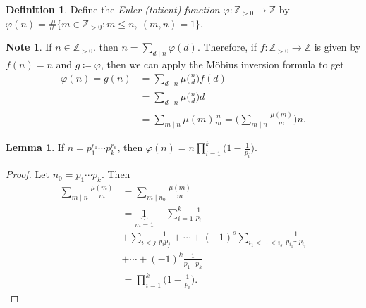 \documentclass[10pt,letterpaper,cm]{nupset}
\theoremstyle{definition}
\newtheorem*{definition}{Definition}
\newtheorem{note}{Note}
\newtheorem{lemma}{Lemma}
\newcommand{\Z}{\mathbb Z}
\newcommand{\1}{\mathbf{1}}
\newcommand{\0}{\vec 0}
\begin{document}
\begin{definition}
Define the \textit{Euler (totient) function $\varphi : \Z_{>0}\to \Z$} by $\varphi(n)= \#\{m\in \Z_{>0} : m\leq  n, \ (m,n)=1\}$.
\end{definition}

\begin{note}
If $n\in \Z_{>0}$. then $n=\sum_{d\mid n}\varphi(d)$. Therefore, if $f: \Z_{>0} \to \Z$ is given by $f(n) =n$ and $g\coloneqq \varphi$, then we can apply the M\"{o}bius inversion formula to get 
\begin{align*}
 \varphi(n)  = g(n) & = \sum_{d\mid n} \mu \big (\frac{n}{d} \big )f(d)
 \\ & =  \sum_{d\mid n} \mu \big (\frac{n}{d} \big )d
 \\ & = \sum_{m \mid n} \mu(m)\frac{n}{m} =  \big ( \sum_{m \mid n} \frac{\mu(m)}{m}\big ) n
. \end{align*}
\end{note}

\begin{lemma}
If $n= p_1^{r_1} \cdots p_k^{r_k}$, then $\varphi(n) =n\prod_{i=1}^k \big (1- \frac{1}{p_i} \big )$.
\end{lemma}
\begin{proof}
Let $n_0 = p_1 \cdots p_k$. Then
\begin{align*}
\sum_{m\mid n}\frac{\mu(m)}{m} & = \sum_{m\mid n_0}\frac{\mu(m)}{m}
\\ & = \underbrace{1}_{m=1} -\sum_{i=1}^k \frac{1}{p_i}
\\ & + \sum_{i<j}\frac{1}{p_ip_j} +\cdots + ({-}1)^s \sum_{i_1 < \cdots < i_s}\frac{1}{p_{i_1}\cdots p_{i_s}}
\\ & + \cdots  +({-}1)^k\frac{1}{p_1\cdots p_k}
\\ & = \prod_{i=1}^k \big (1- \frac{1}{p_i}\big ).
\end{align*}
\end{proof}
\end{document}
